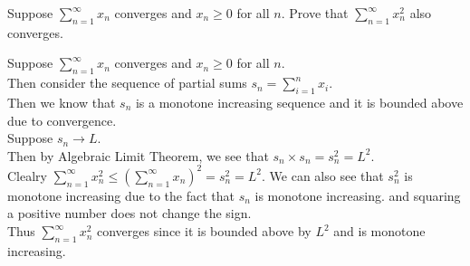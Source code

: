 \documentclass[answers,12pt,addpoints]{exam}
\begin{document}
\begin{questions}

    \question Suppose $\sum_{n=1}^{\infty} x_n$ converges and $x_n \geq 0$ for all $n$. Prove that $\sum_{n=1}^{\infty} x_n^2$ also converges.
    \begin{solution}
        Suppose $\sum_{n=1}^{\infty} x_n$ converges and $x_n \geq 0$ for all $n$.\\
        Then consider the sequence of partial sums $s_n = \sum_{i=1}^{n} x_i$.\\
        Then we know that $s_n$ is a monotone increasing sequence and it is bounded above due to convergence.\\
        Suppose $s_n \to L$.\\
        Then by Algebraic Limit Theorem, we see that $s_n \times s_n = s_n^2 = L^2$.\\
        Clealry $\sum_{n=1}^{\infty} x_n^2 \leq (\sum_{n=1}^{\infty} x_n )^2 = s_n^2 = L^2$.
        We can also see that $s_n^2$ is monotone increasing due to the fact that $s_n$ is monotone increasing. and squaring a positive number does not change the sign.\\
        Thus $\sum_{n=1}^{\infty} x_n^2$ converges since it is bounded above by $L^2$ and is monotone increasing.
    \end{solution}


\end{questions}
\end{document}
